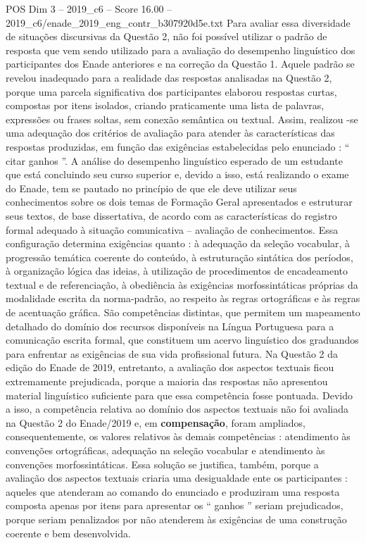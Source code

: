 \begin{textsample}{POS Dim 3 – 2019\_c6 – Score 16.00 – 2019\_c6/enade\_2019\_eng\_contr\_b307920d5e.txt}
Para avaliar essa diversidade de situações discursivas da Questão 2, não foi possível utilizar o padrão de resposta que vem sendo utilizado para a avaliação do desempenho linguístico dos participantes dos Enade anteriores e na correção da Questão 1.
Aquele padrão se revelou inadequado para a realidade das respostas analisadas na Questão 2, porque uma parcela significativa dos participantes elaborou respostas curtas, compostas por itens isolados, criando praticamente uma lista de palavras, expressões ou frases soltas, sem conexão semântica ou textual.
Assim, realizou -se uma adequação dos critérios de avaliação para atender às características das respostas produzidas, em função das exigências estabelecidas pelo enunciado : “ citar ganhos ”.
A análise do desempenho linguístico esperado de um estudante que está concluindo seu curso superior e, devido a isso, está realizando o exame do Enade, tem se pautado no princípio de que ele deve utilizar seus conhecimentos sobre os dois temas de Formação Geral apresentados e estruturar seus textos, de base dissertativa, de acordo com as características do registro formal adequado à situação comunicativa – avaliação de conhecimentos.
Essa configuração determina exigências quanto : à adequação da seleção vocabular, à progressão temática coerente do conteúdo, à estruturação sintática dos períodos, à organização lógica das ideias, à utilização de procedimentos de encadeamento textual e de referenciação, à obediência às exigências morfossintáticas próprias da modalidade escrita da norma-padrão, ao respeito às regras ortográficas e às regras de acentuação gráfica.
São competências distintas, que permitem um mapeamento detalhado do domínio dos recursos disponíveis na Língua Portuguesa para a comunicação escrita formal, que constituem um acervo linguístico dos graduandos para enfrentar as exigências de sua vida profissional futura.
Na Questão 2 da edição do Enade de 2019, entretanto, a avaliação dos aspectos textuais ficou extremamente prejudicada, porque a maioria das respostas não apresentou material linguístico suficiente para que essa competência fosse pontuada.
Devido a isso, a competência relativa ao domínio dos aspectos textuais não foi avaliada na Questão 2 do Enade/2019 e, em \textbf{compensação}, foram ampliados, consequentemente, os valores relativos às demais competências : atendimento às convenções ortográficas, adequação na seleção vocabular e atendimento às convenções morfossintáticas.
Essa solução se justifica, também, porque a avaliação dos aspectos textuais criaria uma desigualdade ente os participantes : aqueles que atenderam ao comando do enunciado e produziram uma resposta composta apenas por itens para apresentar os “ ganhos ” seriam prejudicados, porque seriam penalizados por não atenderem às exigências de uma construção coerente e bem desenvolvida.

\end{textsample}
